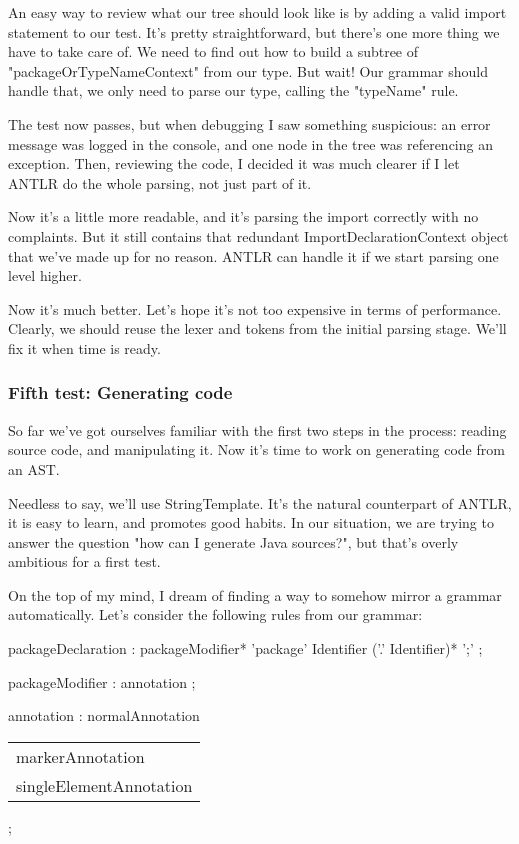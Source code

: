 \documentclass[11pt]{article}
\begin{document}
An easy way to review what our tree should look like is by adding a valid import statement to our test. It's pretty straightforward,
but there's one more thing we have to take care of. We need to find out how to build a subtree of "packageOrTypeNameContext" from our type.
But wait! Our grammar should handle that, we only need to parse our type, calling the "typeName" rule.


The test now passes, but when debugging I saw something suspicious: an error message was logged in the console, and one
node in the tree was referencing an exception. Then, reviewing the code, I decided it was much clearer if I let ANTLR
do the whole parsing, not just part of it.


Now it's a little more readable, and it's parsing the import correctly with no complaints. But it still contains that redundant
ImportDeclarationContext object that we've made up for no reason. ANTLR can handle it if we start parsing one level higher.


Now it's much better. Let's hope it's not too expensive in terms of performance. Clearly, we should reuse the lexer and tokens from the initial parsing stage. We'll fix it
when time is ready.

\subsubsection{Fifth test: Generating code}
\label{sec-1-3-5}

So far we've got ourselves familiar with the first two steps in the process: reading source code, and manipulating it. Now it's time to
work on generating code from an AST.

Needless to say, we'll use StringTemplate. It's the natural counterpart of ANTLR, it is easy to learn, and promotes good habits.
In our situation, we are trying to answer the question "how can I generate Java sources?", but that's overly ambitious for a
first test.

On the top of my mind, I dream of finding a way to somehow mirror a grammar automatically. Let's consider the following rules from our grammar:

packageDeclaration
:        packageModifier* 'package' Identifier ('.' Identifier)* ';'
;

packageModifier
:        annotation
;

annotation
:        normalAnnotation
\begin{center}
\begin{tabular}{l}
markerAnnotation\\
singleElementAnnotation\\
\end{tabular}
\end{center}
;
\end{document}
